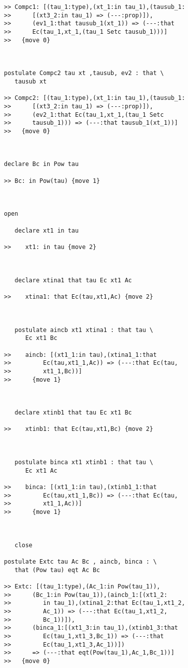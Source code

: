 \documentclass[12pt]{article}
\begin{document}
\begin{verbatim}
>> Compc1: [(tau_1:type),(xt_1:in tau_1),(tausub_1:
>>      [(xt3_2:in tau_1) => (---:prop)]),
>>      (ev1_1:that tausub_1(xt_1)) => (---:that
>>      Ec(tau_1,xt_1,(tau_1 Setc tausub_1)))]
>>   {move 0}



postulate Compc2 tau xt ,tausub, ev2 : that \
   tausub xt

>> Compc2: [(tau_1:type),(xt_1:in tau_1),(tausub_1:
>>      [(xt3_2:in tau_1) => (---:prop)]),
>>      (ev2_1:that Ec(tau_1,xt_1,(tau_1 Setc
>>      tausub_1))) => (---:that tausub_1(xt_1))]
>>   {move 0}



declare Bc in Pow tau

>> Bc: in Pow(tau) {move 1}



open

   declare xt1 in tau

>>    xt1: in tau {move 2}



   declare xtina1 that tau Ec xt1 Ac

>>    xtina1: that Ec(tau,xt1,Ac) {move 2}



   postulate aincb xt1 xtina1 : that tau \
      Ec xt1 Bc

>>    aincb: [(xt1_1:in tau),(xtina1_1:that
>>         Ec(tau,xt1_1,Ac)) => (---:that Ec(tau,
>>         xt1_1,Bc))]
>>      {move 1}



   declare xtinb1 that tau Ec xt1 Bc

>>    xtinb1: that Ec(tau,xt1,Bc) {move 2}



   postulate binca xt1 xtinb1 : that tau \
      Ec xt1 Ac

>>    binca: [(xt1_1:in tau),(xtinb1_1:that
>>         Ec(tau,xt1_1,Bc)) => (---:that Ec(tau,
>>         xt1_1,Ac))]
>>      {move 1}



   close

postulate Extc tau Ac Bc , aincb, binca : \
   that (Pow tau) eqt Ac Bc

>> Extc: [(tau_1:type),(Ac_1:in Pow(tau_1)),
>>      (Bc_1:in Pow(tau_1)),(aincb_1:[(xt1_2:
>>         in tau_1),(xtina1_2:that Ec(tau_1,xt1_2,
>>         Ac_1)) => (---:that Ec(tau_1,xt1_2,
>>         Bc_1))]),
>>      (binca_1:[(xt1_3:in tau_1),(xtinb1_3:that
>>         Ec(tau_1,xt1_3,Bc_1)) => (---:that
>>         Ec(tau_1,xt1_3,Ac_1))])
>>      => (---:that eqt(Pow(tau_1),Ac_1,Bc_1))]
>>   {move 0}



\end{verbatim}
\end{document}

